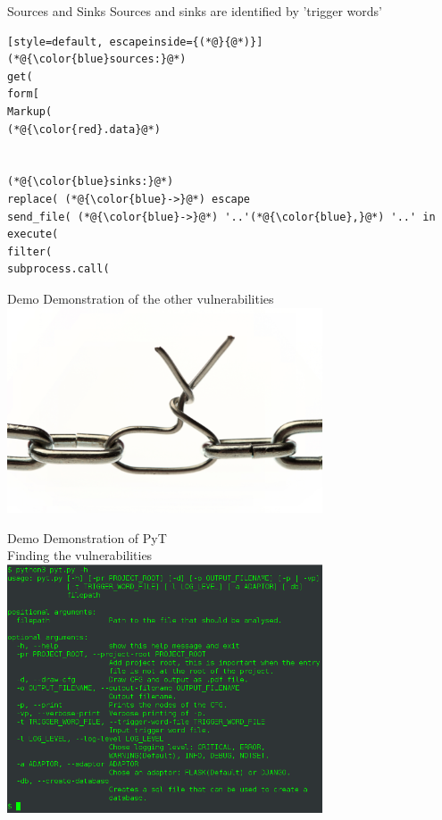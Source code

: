 \begin{frame}
\end{frame}

\begin{frame}[fragile]{Sources and Sinks}
  Sources and sinks are identified by 'trigger words'
  \begin{lstlisting}[style=default, escapeinside={(*@}{@*)}]
(*@{\color{blue}sources:}@*)
get(
form[
Markup(
(*@{\color{red}.data}@*)


(*@{\color{blue}sinks:}@*)
replace( (*@{\color{blue}->}@*) escape
send_file( (*@{\color{blue}->}@*) '..'(*@{\color{blue},}@*) '..' in
execute(
filter(
subprocess.call(
\end{lstlisting}

\end{frame}

\begin{frame}{Demo}
  \centering
    Demonstration of the other vulnerabilities
    \includegraphics[width=0.7\textwidth]{graphics/vulnerability}
\end{frame}


\begin{frame}{Demo}
  \centering
  Demonstration of PyT \\
  Finding the vulnerabilities
    \includegraphics[width=0.7\textwidth]{graphics/pyt_overview.png}
\end{frame}

